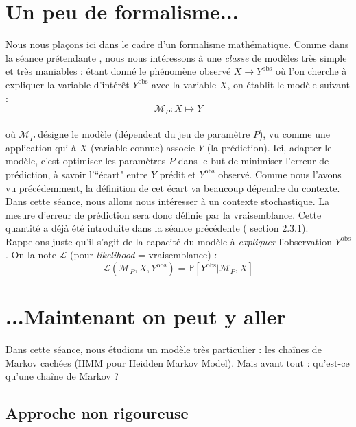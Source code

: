 \documentclass{article}
\begin{document}
\section{Un peu de formalisme...}
Nous nous plaçons ici dans le cadre d'un formalisme mathématique. Comme dans la séance prétendante \cite{1}, nous nous intéressons à une \textit{classe} de modèles très simple et très maniables : étant donné le phénomène observé $X\rightarrow Y^{\text{obs}}$ où l'on cherche à expliquer la variable d'intérêt $Y^{\text{obs}}$ avec la variable $X$, on établit le modèle suivant :
\[\mathcal{M}_P:X \mapsto Y\]
\\
où $\mathcal{M}_P$ désigne le modèle (dépendent du jeu de paramètre $P$), vu comme une application qui à $X$ (variable connue) associe $Y$ (la prédiction). Ici, adapter le modèle, c'est optimiser les paramètres $P$ dans le but de minimiser l'erreur de prédiction, à savoir l'``écart" entre $Y$ prédit et $Y^{\text{obs}}$ observé. Comme nous l'avons vu précédemment, la définition de cet écart va beaucoup dépendre du contexte. Dans cette séance, nous allons nous intéresser à un contexte stochastique. La mesure d'erreur de prédiction sera donc définie par la vraisemblance. Cette quantité a déjà été introduite dans la séance précédente (\cite{1} section 2.3.1). Rappelons juste qu'il s'agit de la capacité du modèle à \textit{expliquer} l'observation $Y^{\text{obs}}$. On la note $\mathcal{L}$ (pour \textit{likelihood} = vraisemblance) :
\[\mathcal{L}(\mathcal{M}_P,X,Y^{\text{obs}}) = \mathbb{P}[Y^{\text{obs}}\vert \mathcal{M}_P,X]\]

\section{ ...Maintenant on peut y aller}

Dans cette séance, nous étudions un modèle très particulier : les cha\^ines de Markov cachées (HMM pour Heidden Markov Model). Mais avant tout : qu'est-ce qu'une chaîne de Markov ?

\subsection{Approche non rigoureuse}
\end{document}
